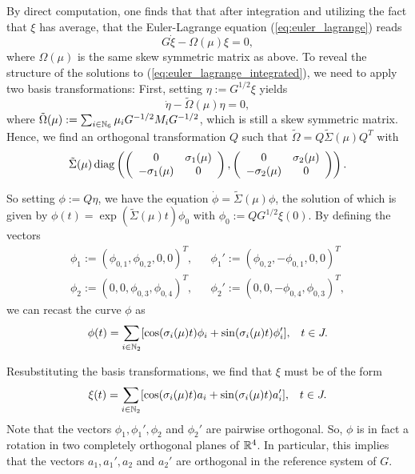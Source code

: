 By direct computation, one finds that that after integration and utilizing the fact that $\xi$ has average, that the Euler-Lagrange equation (\ref{eq:euler_lagrange}) reads
\begin{equation}
\label{eq:euler_lagrange_integrated}
G \dot{\xi} - \Omega(\mu) \xi = 0,
\end{equation}
where $\Omega(\mu)$ is the same skew symmetric matrix as above. To reveal the structure of the solutions to (\ref{eq:euler_lagrange_integrated}), we need to apply two basis transformations: First, setting $\eta := G^{1/2} \xi$ yields
\begin{equation}
\dot{\eta} - \tilde{\Omega}(\mu) \eta = 0,
\end{equation}
where $\tilde{\Omega}(\mu) := \sum_{i \in \mathbb{N}_6} \mu_i G^{-1/2} M_i G^{-1/2}$, which is still a skew symmetric matrix. Hence, we find an orthogonal transformation $Q$ such that $\tilde{\Omega} = Q \tilde{\Sigma}(\mu) Q^T$ with
\begin{align}
	\tilde{\Sigma}(\mu) \operatorname{diag} \left (\left( \begin{array}{cc}
0 & \sigma_1(\mu) \\ 
- \sigma_1(\mu) & 0
\end{array} \right ) , \left ( \begin{array}{cc}
0 & \sigma_2(\mu) \\
- \sigma_2(\mu) & 0
\end{array} \right ) \right ).
\end{align}

So setting $\phi := Q \eta$, we have the equation $\dot{\phi} = \tilde{\Sigma}(\mu) \phi$, the solution of which is given by $\phi(t) = \exp \left ( \tilde{\Sigma}(\mu) t \right )\phi_0$ with $\phi_0 := QG^{1/2}\xi(0)$. By defining the vectors
\begin{align}
	\phi_1 := (\phi_{0,1}, \phi_{0,2}, 0, 0)^T, & & \phi_1' := (\phi_{0,2}, - \phi_{0,1}, 0, 0)^T\\
	\phi_2 := (0,0,\phi_{0,3}, \phi_{0, 4})^T, & & \phi_2' := (0,0,- \phi_{0,4}, \phi_{0,3})^T,
\end{align}
we can recast the curve $\phi$ as
\begin{eqnarray}
\phi(t) = \sum_{i \in \mathbb{N}_2} [\cos(\sigma_i(\mu)t) \phi_i + \sin(\sigma_i(\mu)t) \phi_i'], & & t \in J.
\end{eqnarray}

Resubstituting the basis transformations, we find that $\xi$ must be of the form
\begin{eqnarray}
\label{eq:general_optimal_curve}
\xi(t) = \sum_{i \in \mathbb{N}_2} [\cos(\sigma_i(\mu)t) a_i + \sin(\sigma_i(\mu)t) a_i'], & & t \in J.
\end{eqnarray}
Note that the vectors $\phi_1, \phi_1', \phi_2$ and $\phi_2'$ are pairwise orthogonal. So, $\phi$ is in fact a rotation in two completely orthogonal planes of $\mathbb{R}^4$. In particular, this implies that the vectors $a_1, a_1', a_2$ and $a_2'$ are orthogonal in the reference system of $G$.

